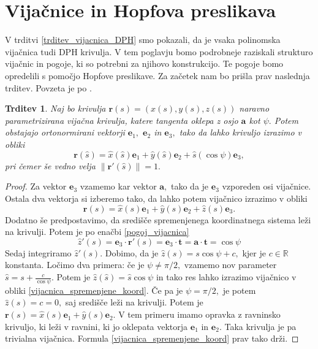 \documentclass[12pt,a4paper,twoside]{article}
\theoremstyle{definition} %
\theoremstyle{plain} %
\newtheorem{trditev}[definicija]{Trditev}
\theoremstyle{primerstyle}
\numberwithin{equation}{section}  %
\newcommand{\R}{\mathbb R}
\newcommand{\tV}{\mathbf{t}}
\newcommand{\aV}{\mathbf{a}}
\newcommand{\eV}{\mathbf{e}}
\newcommand{\rV}{\mathbf{r}}
\begin{document}
\section{Vijačnice in Hopfova preslikava}

V trditvi \ref{trditev_vijacnica_DPH} smo pokazali, da je vsaka polinomska vijačnica tudi DPH krivulja. V tem poglavju bomo podrobneje raziskali strukturo vijačnic in pogoje, ki so potrebni za njihovo konstrukcijo. Te pogoje bomo opredelili s pomočjo Hopfove preslikave. Za začetek nam bo prišla prav naslednja trditev. Povzeta je po \cite[str.\ 72]{lipschutz1969schaum}.
\begin{trditev}
	Naj bo krivulja $\rV(s)=(x(s),y(s),z(s))$ naravno parametrizirana vijačna krivulja, katere tangenta oklepa z osjo $\aV$ kot $\psi.$ Potem obstajajo ortonormirani vektorji $\eV_1,$ $\eV_2$ in $\eV_3,$ tako da lahko krivuljo izrazimo v obliki
	\begin{equation}
		\label{vijacnica_spremenjene_koord}
		\rV(\hat{s})=\hat{x}(\hat{s})\eV_1+\hat{y}(\hat{s})\eV_2+\hat{s}(\cos\psi)\eV_3,
	\end{equation}
	pri čemer še vedno velja $\lVert\rV'(\hat{s})\rVert=1.$
\end{trditev}
\begin{proof}
	Za vektor $\eV_3$ vzamemo kar vektor $\aV,$ tako da je $\eV_3$ vzporeden osi vijačnice. Ostala dva vektorja si izberemo tako, da lahko potem vijačnico izrazimo v obliki
	\begin{equation*}
		\rV(s)=\hat{x}(s)\eV_1+\hat{y}(s)\eV_2+\hat{z}(s)\eV_3.
	\end{equation*}
	Dodatno še predpostavimo, da središče spremenjenega koordinatnega sistema leži na krivulji. Potem je po enačbi \eqref{pogoj_vijacnica} 
	\begin{equation*}
	\hat{z}'(s)=\eV_3\cdot\rV'(s)=\eV_3\cdot\tV=\aV\cdot\tV=\cos\psi
	\end{equation*}
	Sedaj integriramo $\hat{z}'(s).$ Dobimo, da je $\hat{z}(s)=s\cos\psi+c,$ kjer je $c\in\R$ konstanta. Ločimo dva primera: če je $\psi\neq \pi/2,$ vzamemo nov parameter $\hat{s}=s+\frac{c}{\cos\psi}.$ Potem je $\hat{z}(\hat{s})=\hat{s}\cos\psi$ in tako res lahko izrazimo vijačnico v obliki \eqref{vijacnica_spremenjene_koord}. Če pa je $\psi=\pi/2,$ je potem $\hat{z}(s)=c=0,$ saj središče leži na krivulji. Potem je $\rV(s)=\hat{x}(s)\eV_1+\hat{y}(s)\eV_2.$ V tem primeru imamo opravka z ravninsko krivuljo, ki leži v ravnini, ki jo oklepata vektorja $\eV_1$ in $\eV_2.$ Taka krivulja je pa trivialna vijačnica. Formula \eqref{vijacnica_spremenjene_koord} prav tako drži.
\end{proof}
\end{document}
